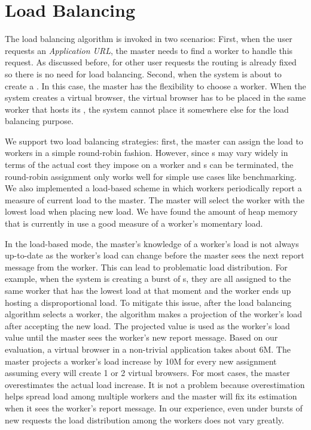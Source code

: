 \section{Load Balancing}
\label{sec:lb}

The load balancing algorithm is invoked in two scenarios:
First, when the user requests an \emph{Application URL},
the master needs to find a worker to handle this request.
As discussed before, for other user requests the routing is already fixed
so there is no need for load balancing.
Second, when the system is about to create a \appins{}.
In this case, the master has the flexibility to choose a worker.
When the system creates a virtual browser, the virtual browser has
to be placed in the same worker that hosts its \appins{}, the system
cannot place it somewhere else for the load balancing purpose.


We support two load balancing strategies: first, the master can assign the
load to workers in a simple round-robin fashion. However, since \appins{}s may
vary widely in terms of the actual cost they impose on a worker and \appins{}s
can be terminated,  the round-robin assignment only works well for simple use
cases like benchmarking. We also implemented a load-based scheme in which
workers periodically report a measure of current load to the master. The
master will select the worker with the lowest load when placing new load.  We
have found the amount of heap memory that is currently in use a good measure
of a worker's  momentary load.

In the load-based mode, the master's knowledge of a worker's load is not
always up-to-date as the worker's load can change before the master sees the
next report message from the worker. This can lead to problematic load
distribution. For example, when the system is creating a burst of \appins{}s,
they are all assigned to the same worker that has the lowest load at that
moment and the worker ends up hosting a disproportional load.  To mitigate
this issue,  after the load balancing algorithm selects a worker, the
algorithm makes a projection of the worker's load after accepting the new
load. The projected value is used as the worker's load value  until the master
sees the worker's new report message. Based on our evaluation, a virtual
browser in a non-trivial application takes about 6M.  The master projects a
worker's load increase by 10M for every new \appins assignment assuming every
\appins will create 1 or 2  virtual browsers.  For most cases, the master
overestimates the actual load increase. It is not a problem because
overestimation helps spread load among multiple  workers and the master will
fix its estimation when it sees the worker's report message. In our
experience, even under bursts of new requests the load distribution among the
workers does not vary greatly.



